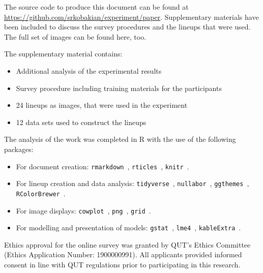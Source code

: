 \documentclass[journal]{vgtc}                     %
\begin{document}
The source code to produce this document can be found at \url{https://github.com/srkobakian/experiment/paper}.
Supplementary materials have been included to discuss the survey procedures and the lineups that were used.
The full set of images can be found here, too.

The supplementary material contains:

\begin{itemize} \itemsep 0in
\item
  Additional analysis of the experimental results
\item
  Survey procedure including training materials for the participants
\item
  24 lineups as images, that were used in the experiment
\item
  12 data sets used to construct the lineups
\end{itemize}

The analysis of the work was completed in R  \cite{RCore} with the use of the following packages:

\begin{itemize} \itemsep 0in
\item
  For document creation: \texttt{rmarkdown}~\cite{rmarkdown}, \texttt{rticles}~\cite{rticles}, \texttt{knitr}~\cite{knitr}.
\item
  For lineup creation and data analysis: \texttt{tidyverse}~\cite{tidyverse}, \texttt{nullabor}~\cite{nullabor}, \texttt{ggthemes}~\cite{ggthemes}, \texttt{RColorBrewer}~\cite{RColorBrewer}.
\item
  For image displays: \texttt{cowplot}~\cite{cowplot}, \texttt{png}~\cite{png}, \texttt{grid}~\cite{grid}.
\item
  For modelling and presentation of models: \texttt{gstat}~\cite{gstat}, \texttt{lme4}~\cite{lme4}, \texttt{kableExtra}~\cite{kableExtra}.
\end{itemize}

Ethics approval for the online survey was granted by QUT's Ethics Committee (Ethics Application Number: 1900000991). All applicants provided informed consent in line with QUT regulations prior to participating in this research.



\end{document}
